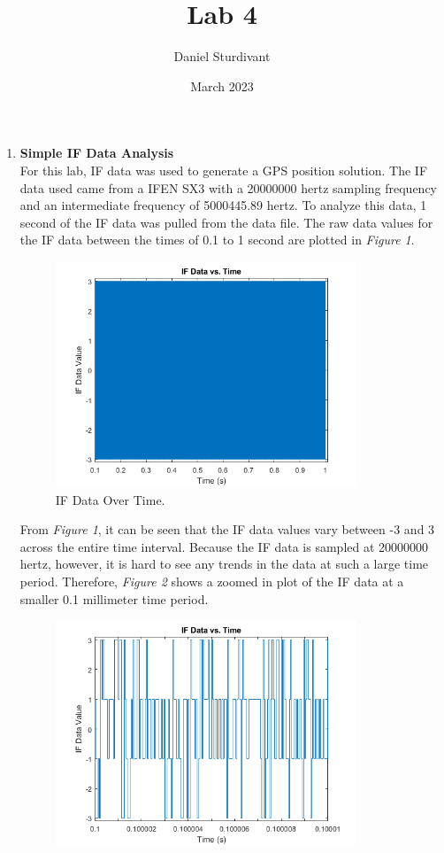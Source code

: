 \documentclass[11pt]{article}
\author{Daniel Sturdivant}
\title{Lab 4}
\date{March 2023}
\begin{document}
\maketitle
\thispagestyle{fancy}
\setlength{\parindent}{0pt}

\begin{enumerate}[label=\textbf{\arabic*.}]
  \itemsep 24pt
    \item \textbf{Simple IF Data Analysis} \\
For this lab, IF data was used to generate a GPS position solution. The IF data used came from a IFEN SX3 with a 20000000 hertz sampling frequency and an intermediate frequency of 5000445.89 hertz. To analyze this data, 1 second of the IF data was pulled from the data file. The raw data values for the IF data between the times of 0.1 to 1 second are plotted in \emph{Figure 1}. 
    \begin{figure}[H]
        \centering
        \includegraphics[width=0.85\textwidth]{Lab_4_IFEN_Time.png}
        \caption{IF Data Over Time.}
    \end{figure}
From \emph{Figure 1}, it can be seen that the IF data values vary between -3 and 3 across the entire time interval. Because the IF data is sampled at 20000000 hertz, however, it is hard to see any trends in the data at such a large time period. Therefore, \emph{Figure 2} shows a zoomed in plot of the IF data at a smaller 0.1 millimeter time period.
    \begin{figure}[H]
        \centering
        \includegraphics[width=0.85\textwidth]{Lab_4_IFEN_Time_2.png}

\end{figure}
\end{enumerate}
\end{document}
